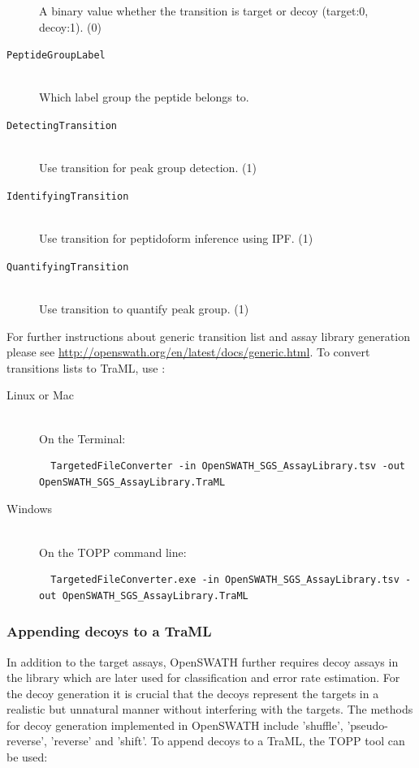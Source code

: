 \begin{description}
  A binary value whether the transition is target or decoy (target:0, decoy:1). (0)
  \item[\texttt{PeptideGroupLabel}] \hfill \\
  Which label group the peptide belongs to. \\
  \item[\texttt{DetectingTransition}] \hfill \\
  Use transition for peak group detection. (1)\\
  \item[\texttt{IdentifyingTransition}] \hfill \\
  Use transition for peptidoform inference using IPF. (1)\\
  \item[\texttt{QuantifyingTransition}] \hfill \\
  Use transition to quantify peak group. (1)\\
\end{description}

\noindent For further instructions about generic transition list and assay library generation please see \url{http://openswath.org/en/latest/docs/generic.html}.
\newline
\noindent To convert transitions lists to TraML, use :\\

\begin{description}
  \item[Linux or Mac] \hfill \\
    On the Terminal:
    \begin{lstlisting}
  TargetedFileConverter -in OpenSWATH_SGS_AssayLibrary.tsv -out OpenSWATH_SGS_AssayLibrary.TraML
  \end{lstlisting}
  \item[Windows] \hfill \\
    On the TOPP command line:
    \begin{lstlisting}
  TargetedFileConverter.exe -in OpenSWATH_SGS_AssayLibrary.tsv -out OpenSWATH_SGS_AssayLibrary.TraML
  \end{lstlisting}
\end{description}

\subsubsection{Appending decoys to a TraML}
In addition to the target assays, OpenSWATH further requires decoy assays in the library which are later used for classification and error rate estimation. For the decoy generation it is crucial that the decoys represent the targets in a realistic but unnatural manner without interfering with the targets. The methods for decoy generation implemented in OpenSWATH include 'shuffle', 'pseudo-reverse', 'reverse' and 'shift'. To append decoys to a TraML, the TOPP tool  can be used:

